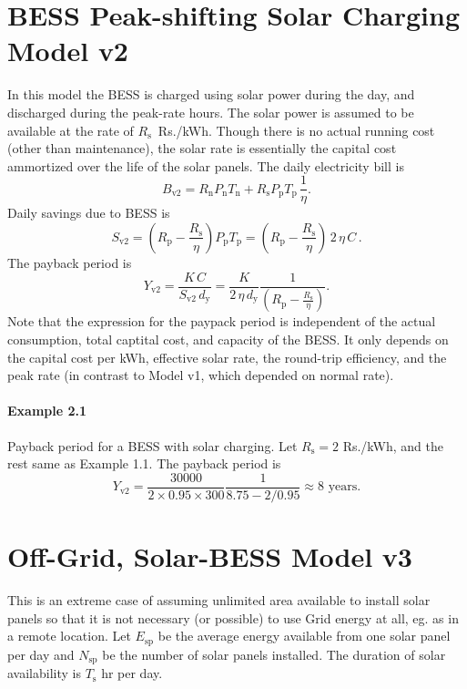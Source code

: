 \documentclass[a4paper]{article}
\begin{document}
\section{BESS Peak-shifting Solar Charging Model v2}
In this model the BESS is charged using solar power during the day, and
discharged during the peak-rate hours. The solar power is
assumed to be available at the rate of $R_{\text{s}}$~Rs./kWh. Though
there is no actual running cost (other than maintenance), the solar
rate is essentially the capital cost ammortized over the life of the
solar panels.  The daily electricity bill is
\begin{equation}
    B_{\text{v2}} = 
    R_{\text{n}} P_{\text{n}} T_{\text{n}} +
    R_{\text{s}} P_{\text{p}} T_{\text{p}} \, \frac{1}{\eta}.
\end{equation} 
Daily savings due to BESS is
\begin{equation}
    S_\text{v2} = \left(R_{\text{p}} - \frac{R_{\text{s}}}{\eta}\right) P_{\text{p}} T_{\text{p}} 
    = \left(R_{\text{p}} - \frac{R_{\text{s}}}{\eta}\right) \, 2 \, \eta \, C \, .
\end{equation}
The payback period is
\begin{equation}
    Y_\text{v2} = \frac{K \, C}{S_\text{v2} \, d_\text{y}} 
    = \frac{K}{2 \, \eta \, d_\text{y}} \frac{1}{\left(R_{\text{p}} - \frac{R_{\text{s}}}{\eta}\right)}.
\end{equation}
Note that the expression for the paypack period is independent of the
actual consumption, total captital cost, and capacity of the BESS. It
only depends on the capital cost per kWh, effective solar rate,
the round-trip efficiency, and the peak rate (in contrast to 
Model v1, which depended on normal rate).


\paragraph{Example 2.1} Payback period for a BESS with solar charging. 
Let $R_{\text{s}} = 2$ Rs./kWh, and the rest same as Example 1.1.
The payback period is
\begin{equation}
    Y_\text{v2} = \frac{30000}{2 \times 0.95 \times 300} 
    \frac{1}{8.75 - 2/0.95} \approx 8 \text{ years}.
\end{equation}

\section{Off-Grid, Solar-BESS Model v3}
This is an extreme case of assuming unlimited area available to
install solar panels so that it is not necessary (or possible) to use
Grid energy at all, eg. as in a remote location. Let $E_\text{sp}$ be the
average energy available from one solar panel per day and $N_\text{sp}$ be
the number of solar panels installed. The duration of solar availability
is $T_\text{s}$ hr per day.
\end{document}
